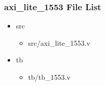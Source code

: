 \subsubsection{axi\_lite\_1553 File List}
\begin{itemize}
\item src
	\begin{itemize}
	\item src/axi\_lite\_1553.v
	\end{itemize}
\item tb
	\begin{itemize}
	\item tb/tb\_1553.v
	\end{itemize}
\end{itemize}
